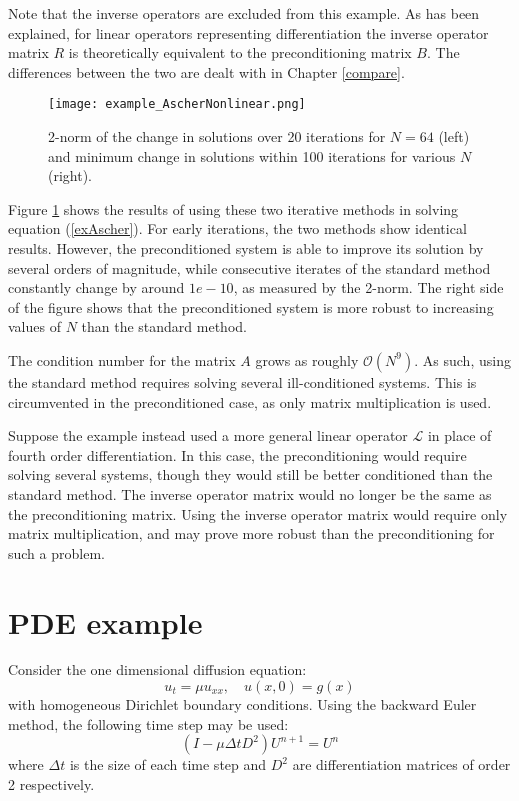 \documentclass{sfuthesis}
\begin{document}
Note that the inverse operators are excluded from this example.
As has been explained, for linear operators representing differentiation the inverse operator matrix $R$ is theoretically equivalent to the preconditioning matrix $B$.
The differences between the two are dealt with in Chapter \ref{compare}.

\begin{figure}
\texttt{[image: example\_AscherNonlinear.png]}
\caption{2-norm of the change in solutions over 20 iterations for $N = 64$ (left) and minimum change in solutions within 100 iterations for various $N$ (right).}
\label{fig:AscherNonlinear}
\end{figure}

Figure \ref{fig:AscherNonlinear} shows the results of using these two iterative methods in solving equation (\ref{exAscher}).
For early iterations, the two methods show identical results.
However, the preconditioned system is able to improve its solution by several orders of magnitude, 
while consecutive iterates of the standard method constantly change by around $1e-10$, as measured by the 2-norm.
The right side of the figure shows that the preconditioned system is more robust to increasing values of $N$ than the standard method.

The condition number for the matrix $A$ grows as roughly $\mathcal{O}(N^9)$.
As such, using the standard method requires solving several ill-conditioned systems.
This is circumvented in the preconditioned case, as only matrix multiplication is used.

Suppose the example instead used a more general linear operator $\mathcal{L}$ in place of fourth order differentiation.
In this case, the preconditioning would require solving several systems, though they would still be better conditioned than the standard method.
The inverse operator matrix would no longer be the same as the preconditioning matrix.
Using the inverse operator matrix would require only matrix multiplication, and may prove more robust than the preconditioning for such a problem.

\section{PDE example}

Consider the one dimensional diffusion equation:
\begin{equation}
u_t = \mu u_{xx}, \quad u(x,0) = g(x)
\end{equation}
with homogeneous Dirichlet boundary conditions.
Using the backward Euler method, the following time step may be used:
\begin{equation}
(I - \mu \Delta t D^2) U^{n+1} = U^n
\end{equation}
where $\Delta t$ is the size of each time step and $D^2$ are differentiation matrices of order 2 respectively.
\end{document}
